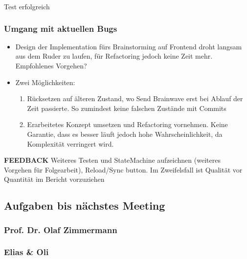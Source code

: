 Test erfolgreich

\hypertarget{umgang-mit-aktuellen-bugs}{%
\subsubsection*{Umgang mit aktuellen
Bugs}\label{umgang-mit-aktuellen-bugs}}

\begin{itemize}

\item
  Design der Implementation fürs Brainstorming auf Frontend droht
  langsam aus dem Ruder zu laufen, für Refactoring jedoch keine Zeit
  mehr. Empfohlenes Vorgehen?
\item
  Zwei Möglichkeiten:

  \begin{enumerate}
  \def\labelenumi{\arabic{enumi}.}
  
  \item
    Rücksetzen auf älteren Zustand, wo Send Brainwave erst bei Ablauf
    der Zeit passierte. So zumindest keine falschen Zustände mit Commits
  \item
    Erarbeitetes Konzept umsetzen und Refactoring vornehmen. Keine
    Garantie, dass es besser läuft jedoch hohe Wahrscheinlichkeit, da
    Komplexität verringert wird.
  \end{enumerate}
\end{itemize}

\textbf{FEEDBACK} Weiteres Testen und StateMachine aufzeichnen (weiteres
Vorgehen für Folgearbeit), Reload/Sync button. Im Zweifelsfall ist
Qualität vor Quantität im Bericht vorzuziehen

\hypertarget{aufgaben-bis-nuxe4chstes-meeting}{%
\subsection*{Aufgaben bis nächstes
Meeting}\label{aufgaben-bis-nuxe4chstes-meeting}}

\hypertarget{prof-dr-olaf-zimmermann}{%
\subsubsection*{Prof. Dr. Olaf
Zimmermann}\label{prof-dr-olaf-zimmermann}}

\hypertarget{elias--oli}{%
\subsubsection*{Elias \& Oli}\label{elias--oli}}